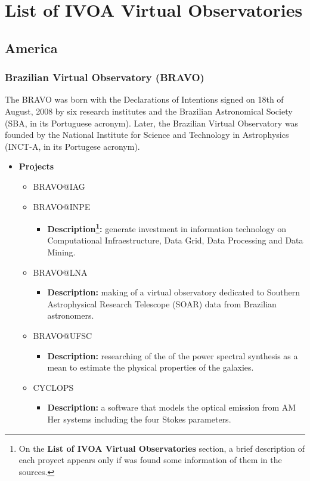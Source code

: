 \section{List of IVOA Virtual Observatories}
\subsection{America}
\subsubsection{Brazilian Virtual Observatory (BRAVO)}
The BRAVO \cite{BRAVO} was born with the Declarations of Intentions signed on
18th of August, 2008 by six research institutes and the Brazilian Astronomical
Society (SBA, in its Portuguese acronym). Later, the Brazilian Virtual
Observatory was founded by the National Institute for Science and Technology in
Astrophysics (INCT-A, in its Portugese acronym).

\begin{itemize}
\item \textbf{Projects}
\begin{itemize}
\item BRAVO@IAG
\item BRAVO@INPE
\begin{itemize}
\item \textbf{Description\footnote{On the \textbf{List of IVOA Virtual
Observatories} section, a brief description of each proyect appears only if was
found some information of them in the sources.}:} generate investment in
information technology on Computational Infraestructure, Data Grid, Data
Processing and Data Mining.
\end{itemize}
\item BRAVO@LNA
\begin{itemize}
\item \textbf{Description:} making of a virtual observatory dedicated to
Southern Astrophysical Research Telescope (SOAR) data from Brazilian
astronomers.  
\end{itemize}
\item BRAVO@UFSC
\begin{itemize}
\item \textbf{Description:} researching of the of the power spectral synthesis
as a mean to estimate the physical properties of the galaxies.
\end{itemize}
\item CYCLOPS
\begin{itemize}
\item \textbf{Description:} a software that models the optical emission from AM
Her systems including the four Stokes parameters.
\end{itemize}
\end{itemize}
\end{itemize}

